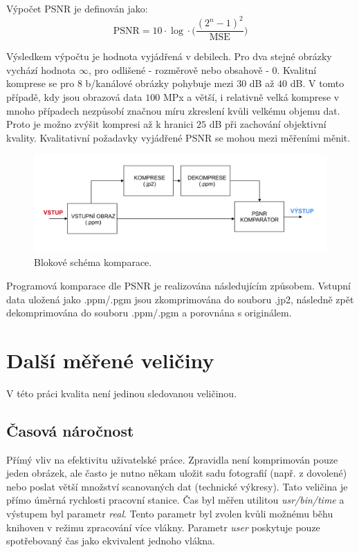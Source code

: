 \noindent Výpočet PSNR je definován jako:
\begin{equation}
  \text{PSNR} = 10 \cdot \log \cdot \bigg(\frac{(2^n-1)^2}{\text{MSE}}\bigg)
  \label{eq:psnr}
\end{equation}

\newpage
\noindent Výsledkem výpočtu je hodnota vyjádřená v debilech. Pro dva stejné obrázky vychází hodnota $\infty$, pro odlišené - rozměrově nebo obsahově - $0$. Kvalitní komprese se pro $8$ b/kanálové obrázky pohybuje mezi $30$ dB až $40$ dB. V tomto případě, kdy jsou obrazová data $100$ MPx a větší, i relativně velká komprese v mnoho případech nezpůsobí značnou míru zkreslení kvůli velkému objemu dat. Proto je možno zvýšit kompresi až k hranici $25$ dB při zachování objektivní kvality. Kvalitativní požadavky vyjádřené PSNR se mohou mezi měřeními měnit.

\begin{figure}[hbt!]
  \centering
  \includegraphics[width=16cm]{obrazky-figures/komparace.pdf}
  \caption{Blokové schéma komparace.}
  \label{retezec}
\end{figure}

\noindent Programová komparace dle PSNR je realizována následujícím způsobem. Vstupní data uložená jako .ppm/.pgm jsou zkomprimována do souboru .jp2, následně zpět dekomprimována do souboru .ppm/.pgm a porovnána s originálem.

\section{Další měřené veličiny}
V této práci kvalita není jedinou sledovanou veličinou.
\subsection*{Časová náročnost}
Přímý vliv na efektivitu uživatelské práce. Zpravidla není komprimován pouze jeden obrázek, ale často je nutno někam uložit sadu fotografií (např. z dovolené) nebo poslat větší množství scanovaných dat (technické výkresy). Tato veličina je přímo úměrná rychlosti pracovní stanice. Čas byl měřen utilitou \textit{usr/bin/time} a výstupem byl parametr \textit{real}. Tento parametr byl zvolen kvůli možnému běhu knihoven v režimu zpracování více vlákny. Parametr \textit{user} poskytuje pouze spotřebovaný čas jako ekvivalent jednoho vlákna.

